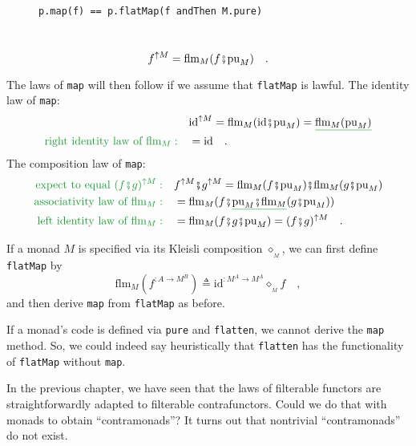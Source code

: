 \begin{wrapfigure}{l}{0.5\columnwidth}%
\vspace{-0.5\baselineskip}
\begin{lstlisting}
p.map(f) == p.flatMap(f andThen M.pure)
\end{lstlisting}

\vspace{-0.5\baselineskip}
\end{wrapfigure}%

~\vspace{-0.1\baselineskip}
\[
f^{\uparrow M}=\text{flm}_{M}(f\bef\text{pu}_{M})\quad.
\]

The laws of \lstinline!map! will then follow if we assume that \lstinline!flatMap!
is lawful. The identity law of \lstinline!map!:
\begin{align*}
 & \text{id}^{\uparrow M}=\text{flm}_{M}(\text{id}\bef\text{pu}_{M})=\gunderline{\text{flm}_{M}(\text{pu}_{M})}\\
{\color{greenunder}\text{right identity law of }\text{flm}_{M}:}\quad & =\text{id}\quad.
\end{align*}
The composition law of \lstinline!map!:
\begin{align*}
{\color{greenunder}\text{expect to equal }(f\bef g)^{\uparrow M}:}\quad & f^{\uparrow M}\bef g^{\uparrow M}=\text{flm}_{M}(f\bef\text{pu}_{M})\bef\text{flm}_{M}(g\bef\text{pu}_{M})\\
{\color{greenunder}\text{associativity law of }\text{flm}_{M}:}\quad & =\text{flm}_{M}(f\bef\gunderline{\text{pu}_{M}\bef\text{flm}_{M}}(g\bef\text{pu}_{M}))\\
{\color{greenunder}\text{left identity law of }\text{flm}_{M}:}\quad & =\text{flm}_{M}(f\bef g\bef\text{pu}_{M})=(f\bef g)^{\uparrow M}\quad.
\end{align*}

If a monad $M$ is specified via its Kleisli composition $\diamond_{_{M}}$,
we can first define \lstinline!flatMap! by
\[
\text{flm}_{M}(f^{:A\rightarrow M^{B}})\triangleq\text{id}^{:M^{A}\rightarrow M^{A}}\diamond_{_{M}}f\quad,
\]
and then derive \lstinline!map! from \lstinline!flatMap! as before.

If a monad\textsf{'}s code is defined via \lstinline!pure! and \lstinline!flatten!,
we cannot derive the \lstinline!map! method. So, we could indeed
say heuristically that \lstinline!flatten! has the functionality
of \lstinline!flatMap! without \lstinline!map!.

In the previous chapter, we have seen that the laws of filterable
functors are straightforwardly adapted to filterable contrafunctors.
Could we do that with monads to obtain \textsf{``}contramonads\textsf{''}? It turns
out that nontrivial \textsf{``}contramonads\textsf{''} do not
exist. 

